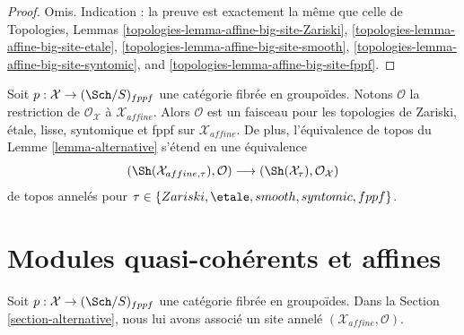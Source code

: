 \begin{proof}
Omis. Indication : la preuve est exactement la même que celle de
Topologies, Lemmas
\ref{topologies-lemma-affine-big-site-Zariski},
\ref{topologies-lemma-affine-big-site-etale},
\ref{topologies-lemma-affine-big-site-smooth},
\ref{topologies-lemma-affine-big-site-syntomic}, and
\ref{topologies-lemma-affine-big-site-fppf}.
\end{proof}

\noindent
Soit $p : \mathcal{X} \to (\Sch/S)_{fppf}$ une catégorie fibrée en groupoïdes.
Notons $\mathcal{O}$ la restriction de $\mathcal{O}_\mathcal{X}$
à $\mathcal{X}_{affine}$. Alors $\mathcal{O}$ est un faisceau pour les topologies
de Zariski, étale, lisse, syntomique et fppf sur
$\mathcal{X}_{affine}$. De plus, l'équivalence de topos du
Lemme \ref{lemma-alternative} s'étend en une équivalence
\begin{equation}
\label{equation-alternative-ringed}
(\Sh(\mathcal{X}_{affine, \tau}), \mathcal{O})
\longrightarrow
(\Sh(\mathcal{X}_\tau), \mathcal{O}_\mathcal{X})
\end{equation}
de topos annelés pour $\tau \in \{Zariski, \etale, smooth, syntomic, fppf\}$.









\section{Modules quasi-cohérents et affines}
\label{section-alternative-quasi-coherent}

\noindent
Soit $p : \mathcal{X} \to (\Sch/S)_{fppf}$ une catégorie fibrée en groupoïdes.
Dans la Section \ref{section-alternative}, nous lui avons associé un site annelé
$(\mathcal{X}_{affine}, \mathcal{O})$.

